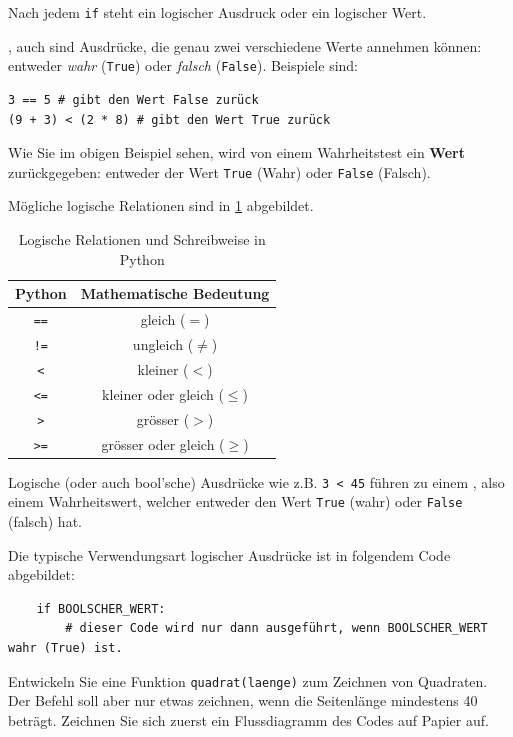 Nach jedem \lstinline|if| steht ein logischer Ausdruck oder ein logischer Wert.

\begin{mydefinition}
, auch  sind Ausdrücke, die genau zwei verschiedene Werte annehmen können: entweder \textit{wahr} (\lstinline|True|) oder \textit{falsch} (\lstinline|False|). Beispiele sind:
\begin{lstlisting}
3 == 5 # gibt den Wert False zurück
(9 + 3) < (2 * 8) # gibt den Wert True zurück
\end{lstlisting}

Wie Sie im obigen Beispiel sehen, wird von einem Wahrheitstest ein \textbf{Wert} zurückgegeben: entweder der Wert \lstinline|True| (Wahr) oder \lstinline|False| (Falsch).

Mögliche logische Relationen sind in \cref{table:bool} abgebildet.
\begin{table}[H]
	\centering
	\begin{tabular}{c||c}
		\textbf{Python} & \textbf{Mathematische Bedeutung} \\\midrule
		\lstinline|==|  & gleich ($=$)                     \\
		\lstinline|!=|  & ungleich ($\neq$)                \\
		\lstinline|<|   & kleiner ($<$)                    \\
		\lstinline|<=|  & kleiner oder gleich ($\leq$)     \\
		\lstinline|>|   & grösser ($>$)                    \\
		\lstinline|>=|  & grösser oder gleich ($\geq$)
	\end{tabular}
	\caption{Logische Relationen und Schreibweise in Python}
	\label{table:bool}
\end{table}
Logische (oder auch bool'sche) Ausdrücke wie z.B. \lstinline|3 < 45| führen zu einem , also einem Wahrheitswert, welcher entweder den Wert \lstinline|True| (wahr) oder \lstinline|False| (falsch) hat.

Die typische Verwendungsart logischer Ausdrücke ist in folgendem Code abgebildet:
\begin{lstlisting}
	if BOOLSCHER_WERT:
		# dieser Code wird nur dann ausgeführt, wenn BOOLSCHER_WERT wahr (True) ist.
\end{lstlisting}
\end{mydefinition}



\begin{myexercise}
	Entwickeln Sie eine Funktion \lstinline|quadrat(laenge)| zum Zeichnen von Quadraten. Der Befehl soll aber nur etwas zeichnen, wenn die Seitenlänge mindestens 40 beträgt. Zeichnen Sie sich zuerst ein Flussdiagramm des Codes auf Papier auf.
	\begin{myanswer}
		
	\end{myanswer}
\end{myexercise}

